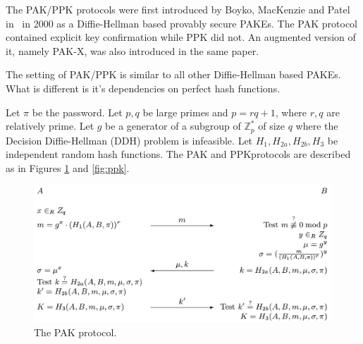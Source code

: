

The PAK/PPK protocols were first introduced by Boyko, MacKenzie and Patel in~\cite{BoMaPa00} in 2000
as a Diffie-Hellman based provably secure PAKEs. The PAK protocol contained explicit key confirmation
while PPK did not. An augmented version of it, namely PAK-X, was also introduced in the same paper.

The setting of PAK/PPK is similar to all other Diffie-Hellman based PAKEs. What is different is it's dependencies on perfect hash functions.

Let $\pi$ be the password. Let $p, q$ be large primes and $p = rq+1$, where $r, q$ are relatively prime.
Let $g$ be a generator of a subgroup of $\mathbb{Z}^\ast_p$ of size $q$ where the Decision
Diffie-Hellman (DDH) problem is infeasible. Let $H_1, H_{2a}, H_{2b}, H_3$ be independent random hash 
functions. The PAK and PPKprotocols are described as in Figures \ref{fig:pak} and \ref{fig:ppk}. 
\iffalse    %
\begin{figure}[h]
    \centering
    \label{fig:pak}
    \includegraphics[scale=0.4]{pak_protocol.png}
    \caption{The PAK protocol.}
\end{figure}

